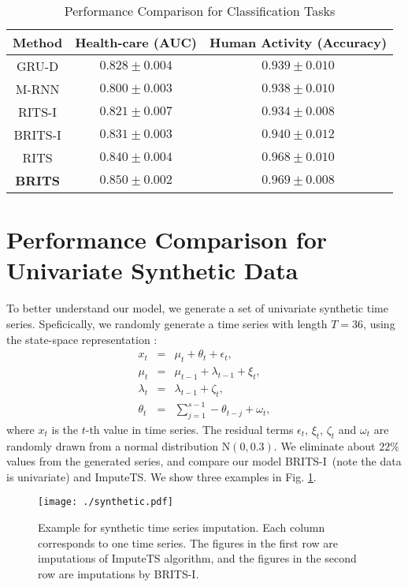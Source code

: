 \documentclass{article}
\newcommand{\ritsi}{\xspace{RITS-I}}
\newcommand{\britsi}{\xspace{BRITS-I}}
\newcommand{\rits}{\xspace{RITS}}
\newcommand{\brits}{\xspace{BRITS}}
\begin{document}
  \begin{table}[htbp]
\centering
\renewcommand\arraystretch{1.2}
\caption{Performance Comparison for Classification Tasks}
\label{tab:classification}
\begin{tabular}{c|c|c}
\hline
Method                 & Health-care  (AUC)     & Human Activity (Accuracy)    \\ \hline
GRU-D                  & $0.828 \pm 0.004$ & $0.939 \pm 0.010$ \\ \hline
M-RNN                  & $0.800 \pm 0.003$ & $0.938 \pm 0.010$ \\ \hline\hline
\ritsi  & $0.821 \pm 0.007$ & $0.934 \pm 0.008$ \\ \hline 
\britsi & $0.831 \pm 0.003$ & $0.940 \pm 0.012$ \\ \hline
\rits   & $0.840 \pm 0.004$ & $0.968 \pm 0.010$ \\ \hline
{\bf \brits}  & $\mathbf{0.850 \pm 0.002}$ & $\mathbf{0.969 \pm 0.008}$ \\ \hline
\end{tabular}
\end{table}



\section{Performance Comparison for Univariate Synthetic Data}
\label{appendix:synthetic}
To better understand our model, we generate a set of univariate synthetic time series. 
Speficically, we randomly generate a time series with length $T = 36$, using the state-space representation \cite{harvey1990forecasting}: 
\begin{eqnarray*}
x_t &=& \mu_t + \theta_t + \epsilon_t,\\
\mu_t &=& \mu_{t - 1} + \lambda_{t - 1} + \xi_t,\\
\lambda_t &=& \lambda_{t - 1} + \zeta_t, \\
\theta_t &=& \sum_{j = 1}^{s - 1} -\theta_{t - j} + \omega_t,
\end{eqnarray*}
where $x_t$ is the $t$-th value in time series. The residual terms $\epsilon_t$, $\xi_t$, $\zeta_t$ and $\omega_t$ are randomly drawn from a normal distribution $\mathrm{N}(0, 0.3)$. We eliminate about $22\%$ values from the generated series, and compare our model \britsi~(note the data is univariate) and ImputeTS. We show three examples in Fig. \ref{fig:synthetic_example}.

\begin{figure}[htbp]
\centering
\footnotesize
\texttt{[image: ./synthetic.pdf]}
\caption{Example for synthetic time series imputation. Each column corresponds to one time series. The figures in the first row are imputations of ImputeTS algorithm, and the figures in the second row are imputations by \britsi.}
\label{fig:synthetic_example}
\end{figure}
\end{document}
